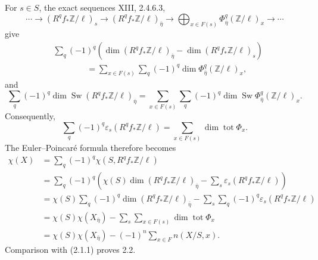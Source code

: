 For $s\in S$, the exact sequences XIII, 2.4.6.3,
\[
\cdots\longrightarrow(R^qf_*\mathbb Z/\ell)_s
\longrightarrow(R^qf_*\mathbb Z/\ell)_{\bar\eta}
\longrightarrow\bigoplus_{x\in F(s)}
\Phi^q_{\bar\eta}(\mathbb Z/\ell)_x
\longrightarrow\cdots
\]
give
\begin{equation}\tag{a}
\begin{aligned}
&\sum_q(-1)^q\left(
\dim(R^qf_*\mathbb Z/\ell)_{\bar\eta}
-\dim(R^qf_*\mathbb Z/\ell)_s\right)\\
&\hspace{4em}=\sum_{x\in F(s)}\sum_q(-1)^q
\dim\Phi^q_{\bar\eta}(\mathbb Z/\ell)_x,
\end{aligned}
\end{equation}
and
\begin{equation}\tag{b}
\sum_q(-1)^q\dim\operatorname{Sw}
(R^qf_*\mathbb Z/\ell)_{\bar\eta}
=\sum_{x\in F(s)}\sum_q(-1)^q
\dim\operatorname{Sw}\Phi^q_{\bar\eta}(\mathbb Z/\ell)_x.
\end{equation}
Consequently,
\begin{equation}\tag{c}
\sum_q(-1)^q\varepsilon_s(R^qf_*\mathbb Z/\ell)
=\sum_{x\in F(s)}\dim\operatorname{tot}\Phi_x.
\end{equation}
The Euler--Poincar\'e formula therefore becomes
\begin{align*}
\chi(X)
&=\sum_q(-1)^q\chi(S,R^qf_*\mathbb Z/\ell)\\
&=\sum_q(-1)^q\left(
\chi(S)\dim(R^qf_*\mathbb Z/\ell)_{\bar\eta}
-\sum_s\varepsilon_s(R^qf_*\mathbb Z/\ell)\right)\\
&=\chi(S)\sum_q(-1)^q
\dim(R^qf_*\mathbb Z/\ell)_{\bar\eta}
-\sum_s\sum_q(-1)^q\varepsilon_s(R^qf_*\mathbb Z/\ell)\\
&=\chi(S)\chi(X_{\bar\eta})
-\sum_s\sum_{x\in F(s)}\dim\operatorname{tot}\Phi_x\\
&=\chi(S)\chi(X_{\bar\eta})
-(-1)^n\sum_{x\in F}n(X/S,x).
\end{align*}
Comparison with (2.1.1) proves 2.2.
